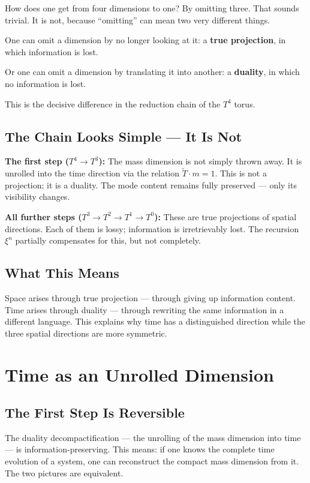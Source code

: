 \documentclass[12pt,oneside]{book}
\begin{document}
How does one get from four dimensions to one? By omitting three. That sounds trivial. It is not, because ``omitting'' can mean two very different things.

One can omit a dimension by no longer looking at it: a \textbf{true projection}, in which information is lost.

Or one can omit a dimension by translating it into another: a \textbf{duality}, in which no information is lost.

This is the decisive difference in the reduction chain of the $T^4$ torus.

\section{The Chain Looks Simple --- It Is Not}

\textbf{The first step ($T^4 \to T^3$):} The mass dimension is not simply thrown away. It is unrolled into the time direction via the relation $\tilde{T} \cdot m = 1$. This is not a projection; it is a duality. The mode content remains fully preserved --- only its visibility changes.

\textbf{All further steps ($T^3 \to T^2 \to T^1 \to T^0$):} These are true projections of spatial directions. Each of them is lossy; information is irretrievably lost. The recursion $\xi^n$ partially compensates for this, but not completely.

\section{What This Means}

Space arises through true projection --- through giving up information content. Time arises through duality --- through rewriting the same information in a different language. This explains why time has a distinguished direction while the three spatial directions are more symmetric.

\chapter{Time as an Unrolled Dimension}

\section{The First Step Is Reversible}

The duality decompactification --- the unrolling of the mass dimension into time --- is information-preserving. This means: if one knows the complete time evolution of a system, one can reconstruct the compact mass dimension from it. The two pictures are equivalent.
\end{document}
